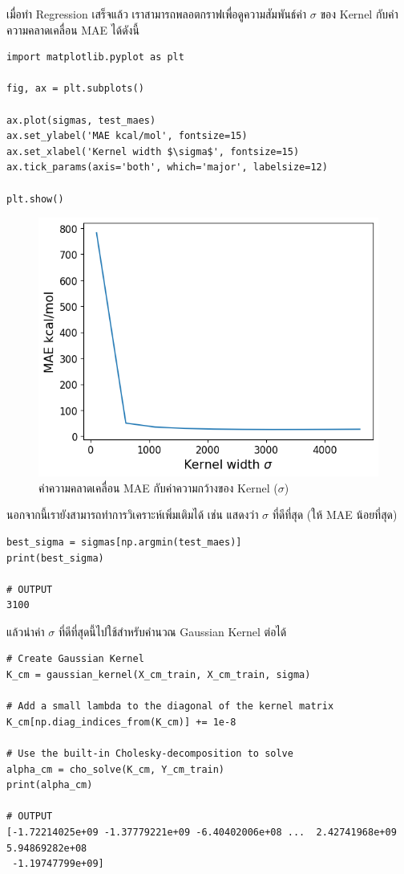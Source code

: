 เมื่อทำ Regression เสร็จแล้ว เราสามารถพลอตกราฟเพื่อดูความสัมพันธ์ค่า $\sigma$ ของ Kernel กับค่าความคลาดเคลื่อน MAE ได้ดังนี้

\begin{lstlisting}[style=MyPython]
import matplotlib.pyplot as plt

fig, ax = plt.subplots()

ax.plot(sigmas, test_maes)
ax.set_ylabel('MAE kcal/mol', fontsize=15)
ax.set_xlabel('Kernel width $\sigma$', fontsize=15)
ax.tick_params(axis='both', which='major', labelsize=12)

plt.show()
\end{lstlisting}

\begin{figure}[htbp]
    \centering
    \includegraphics[width=0.9\linewidth]{fig/qm9_cm_mae_sigma.png}
    \caption{ค่าความคลาดเคลื่อน MAE กับค่าความกว้างของ Kernel ($\sigma$)}
    \label{fig:qm9_cm_kernel_mae}
\end{figure}

นอกจากนี้เรายังสามารถทำการวิเคราะห์เพิ่มเติมได้ เช่น แสดงว่า $\sigma$ ที่ดีที่สุด (ให้ MAE น้อยที่สุด)

\begin{lstlisting}[style=MyPython]
best_sigma = sigmas[np.argmin(test_maes)]
print(best_sigma)

# OUTPUT
3100
\end{lstlisting}

\noindent แล้วนำค่า $\sigma$ ที่ดีที่สุดนี้ไปใช้สำหรับคำนวณ Gaussian Kernel ต่อได้

\begin{lstlisting}[style=MyPython]
# Create Gaussian Kernel
K_cm = gaussian_kernel(X_cm_train, X_cm_train, sigma)

# Add a small lambda to the diagonal of the kernel matrix
K_cm[np.diag_indices_from(K_cm)] += 1e-8

# Use the built-in Cholesky-decomposition to solve
alpha_cm = cho_solve(K_cm, Y_cm_train)
print(alpha_cm)

# OUTPUT
[-1.72214025e+09 -1.37779221e+09 -6.40402006e+08 ...  2.42741968e+09  5.94869282e+08
 -1.19747799e+09]
\end{lstlisting}

